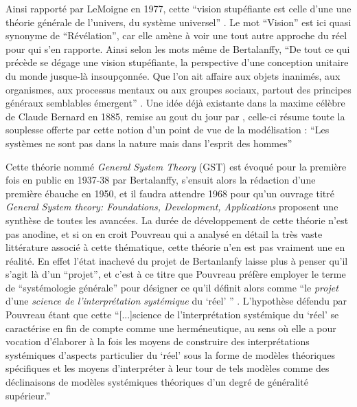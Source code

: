 Ainsi rapporté par LeMoigne en 1977, cette \enquote{vision stupéfiante est celle d'une une théorie générale de l'univers, du système universel} \autocite[59]{Lemoigne1977}. Le mot \enquote{Vision} est ici quasi synonyme de \enquote{Révélation}, car elle amène à voir une tout autre approche du réel pour qui s'en rapporte. Ainsi selon les mots même de Bertalanffy, \enquote{De tout ce qui précède se dégage une vision stupéfiante, la perspective d'une conception unitaire du monde jusque-là insoupçonnée. Que l'on ait affaire aux objets inanimés, aux organismes, aux processus mentaux ou aux groupes sociaux, partout des principes généraux semblables émergent} \autocite[59]{Lemoigne1977} \autocite[220]{Bertalanffy1949}. Une idée déjà existante dans la maxime célèbre de Claude Bernard en 1885, remise au gout du jour par \autocite{Lemoigne1977}, celle-ci résume toute la souplesse offerte par cette notion d'un point de vue de la modélisation :  \enquote{Les systèmes ne sont pas dans la nature mais dans l'esprit des hommes}

Cette théorie nommé \textit{General System Theory} (GST) est évoqué pour la première fois en public en 1937-38 par Bertalanffy, s'ensuit alors la rédaction d'une première ébauche en 1950, et il faudra attendre 1968 pour qu'un ouvrage titré \textit{General System theory: Foundations, Development, Applications} proposent une synthèse de toutes les avancées. La durée de développement de cette théorie n'est pas anodine, et si on en croit Pouvreau \autocite{Pouvreau2013} qui a analysé en détail la très vaste littérature associé à cette thématique, cette théorie n'en est pas vraiment une en réalité. En effet l'état inachevé du projet de Bertanlanfy laisse plus à penser qu'il s'agit là d'un \enquote{projet}, et c'est à ce titre que Pouvreau préfère employer le terme de \enquote{systémologie générale} pour désigner ce qu'il définit alors comme \enquote{le \textit{projet} d'une \textit{science de l'interprétation systémique} du \enquote{réel} } \autocite[9]{Pouvreau2013}. L'hypothèse défendu par Pouvreau étant que cette \enquote{[...]science de l'interprétation systémique du \enquote{réel} se caractérise en fin de compte comme une herméneutique, au sens où elle a pour vocation d'élaborer à la fois les moyens de construire des interprétations systémiques d'aspects particulier du \enquote{réel} sous la forme de modèles théoriques spécifiques et les moyens d'interpréter à leur tour de tels modèles comme des déclinaisons de modèles systémiques théoriques d'un degré de généralité supérieur.}\autocite[9-10]{Pouvreau2013}

